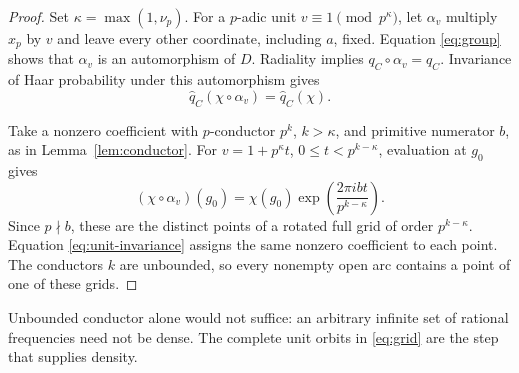 \begin{proof}
Set \(\kappa=\max(1,\nu_p)\). For a \(p\)-adic unit
\(v\equiv1\pmod{p^\kappa}\), let \(\alpha_v\) multiply \(x_p\) by \(v\)
and leave every other coordinate, including \(a\), fixed.
Equation \eqref{eq:group} shows that \(\alpha_v\) is an automorphism of
\(D\). Radiality implies \(q_C\circ\alpha_v=q_C\). Invariance of Haar
probability under this automorphism gives
\begin{equation}\label{eq:unit-invariance}
\widehat q_C(\chi\circ\alpha_v)=\widehat q_C(\chi).
\end{equation}

Take a nonzero coefficient with \(p\)-conductor \(p^k\), \(k>\kappa\),
and primitive numerator \(b\), as in Lemma~\ref{lem:conductor}.
For \(v=1+p^\kappa t\), \(0\leq t<p^{k-\kappa}\), evaluation at \(g_0\)
gives
\begin{equation}\label{eq:grid}
(\chi\circ\alpha_v)(g_0)
=\chi(g_0)\exp\left(\frac{2\pi i bt}{p^{k-\kappa}}\right).
\end{equation}
Since \(p\nmid b\), these are the distinct points of a rotated full
grid of order \(p^{k-\kappa}\). Equation \eqref{eq:unit-invariance}
assigns the same nonzero coefficient to each point. The conductors
\(k\) are unbounded, so every nonempty open arc contains a point of one
of these grids.
\end{proof}

Unbounded conductor alone would not suffice: an arbitrary infinite set
of rational frequencies need not be dense. The complete unit orbits
in \eqref{eq:grid} are the step that supplies density.

